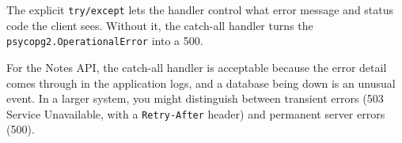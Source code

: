 \begin{codebox}[short]

\begin{Shaded}
\begin{Highlighting}[]
\NormalTok{):}
    \NormalTok{:}
\OperatorTok{=}
\OperatorTok{=}
\OperatorTok{=}
\StringTok{: }
        \NormalTok{: }\NormalTok{\}), }

     \NormalTok{:}
        \NormalTok{: }\SpecialCharTok{\{}\SpecialCharTok{\}}\NormalTok{\}), }

\end{Highlighting}
\end{Shaded}

\end{codebox}

\noindent{}The explicit \texttt{try/except} lets the handler control what error message and status code the client sees. Without it, the catch-all handler turns the \texttt{psycopg2.}\allowbreak{}\texttt{OperationalError} into a 500.

For the Notes API, the catch-all handler is acceptable because the error detail comes through in the application logs, and a database being down is an unusual event. In a larger system, you might distinguish between transient errors (503 Service Unavailable, with a \texttt{Retry-After} header) and permanent server errors (500).

